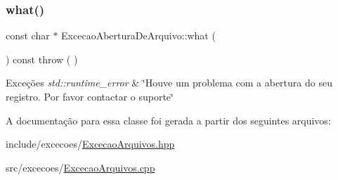 \subsubsection{\texorpdfstring{what()}{what()}}
{\footnotesize\ttfamily const char $\ast$ Excecao\+Abertura\+De\+Arquivo\+::what (\begin{DoxyParamCaption}{ }\end{DoxyParamCaption}) const throw ( ) \hspace{0.3cm}{\ttfamily [virtual]}}


\begin{DoxyExceptions}{Exceções}
{\em std\+::runtime\+\_\+error} & \char`\"{}\+Houve um problema com a abertura do seu registro. Por favor contactar o suporte\char`\"{} \\
\hline
\end{DoxyExceptions}


A documentação para essa classe foi gerada a partir dos seguintes arquivos\+:\begin{DoxyCompactItemize}
\item 
include/excecoes/\mbox{\hyperlink{_excecao_arquivos_8hpp}{Excecao\+Arquivos.\+hpp}}\item 
src/excecoes/\mbox{\hyperlink{_excecao_arquivos_8cpp}{Excecao\+Arquivos.\+cpp}}\end{DoxyCompactItemize}
